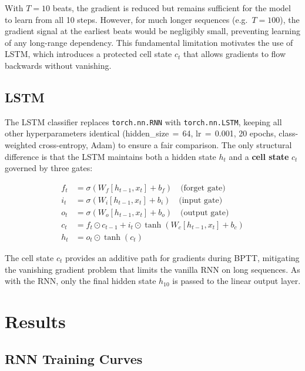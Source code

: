\documentclass[twocolumn, fontsize=10pt]{article}
\begin{document}
With $T = 10$ beats, the gradient is reduced but remains sufficient for the model to 
learn from all 10 steps. However, for much longer sequences (e.g.\ $T = 100$), the 
gradient signal at the earliest beats would be negligibly small, preventing learning of 
any long-range dependency. This fundamental limitation motivates the use of LSTM, which 
introduces a protected cell state $c_t$ that allows gradients to flow backwards without 
vanishing.

\subsection{LSTM}
The LSTM classifier replaces \texttt{torch.nn.RNN} with \texttt{torch.nn.LSTM},
keeping all other hyperparameters identical (hidden\_size$\,=\,$64,
lr$\,=\,$0.001, 20 epochs, class-weighted cross-entropy, Adam) to ensure a fair
comparison. The only structural difference is that the LSTM maintains both a
hidden state $h_t$ and a \textbf{cell state} $c_t$ governed by three gates:

\begin{align}
f_t &= \sigma(W_f [h_{t-1}, x_t] + b_f) \quad \text{(forget gate)} \nonumber\\
i_t &= \sigma(W_i [h_{t-1}, x_t] + b_i) \quad \text{(input gate)} \nonumber\\
o_t &= \sigma(W_o [h_{t-1}, x_t] + b_o) \quad \text{(output gate)} \nonumber\\
c_t &= f_t \odot c_{t-1} + i_t \odot \tanh(W_c [h_{t-1}, x_t] + b_c) \nonumber\\
h_t &= o_t \odot \tanh(c_t) \nonumber
\end{align}

The cell state $c_t$ provides an additive path for gradients during BPTT,
mitigating the vanishing gradient problem that limits the vanilla RNN on long
sequences. As with the RNN, only the final hidden state $h_{10}$ is passed to
the linear output layer.



\section{Results}
\label{sec:results}

\subsection{RNN Training Curves}
\end{document}

